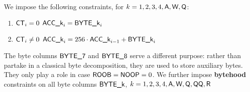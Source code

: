 We impose the following constraints, for $k = 1, 2, 3, 4, \textsf{A}, \textsf{W}, \textsf{Q}$:
\begin{enumerate}
	\item \If $\textsf{CT}_{i} = 0$ \Then $\textsf{ACC}\textsf{\_k}_{i} = \textsf{BYTE}\textsf{\_k}_{i}$
	\item \If $\textsf{CT}_{i} \neq 0$ \Then $\textsf{ACC}\textsf{\_k}_{i} = 256 \cdot \textsf{ACC}\textsf{\_k}_{i - 1} + \textsf{BYTE}\textsf{\_k}_{i}$
\end{enumerate}
The byte columns $\textsf{BYTE}\textsf{\_7}$ and $\textsf{BYTE}\textsf{\_8}$ serve a different purpose: rather than partake in a classical byte decomposition, they are used to store auxiliary bytes. They only play a role in case $\textsf{ROOB} = \textsf{NOOP} = 0$. We further impose \textbf{bytehood} constraints on all byte columns $\textsf{BYTE}\textsf{\_k}$, $k = 1, 2, 3, 4, \textsf{A}, \textsf{W}, \textsf{Q}, \textsf{QQ}, \textsf{R}$